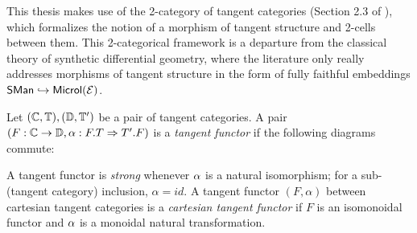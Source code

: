 This thesis makes use of the 2-category of tangent categories (Section 2.3 of \cite{Cockett2014}), which formalizes the notion of a morphism of tangent structure and 2-cells between them. This 2-categorical framework is a departure from the classical theory of synthetic differential geometry, where the literature only really addresses morphisms of tangent structure in the form of fully faithful embeddings $\mathsf{SMan} \hookrightarrow \mathsf{Microl}(\mathcal{E})$.

\begin{definition}\label{def:tang-functor}
    Let $(\mathbb{C}, \mathbb{T}), (\mathbb{D}, \mathbb{T}')$ be a pair of tangent categories. A pair $(F: \mathbb{C} \to \mathbb{D}, \alpha:F.T \Rightarrow T'.F)$ is a \emph{tangent functor} if the following diagrams commute:
    \begin{center}
        
    \end{center}
    A tangent functor is \emph{strong} whenever $\alpha$ is a natural isomorphism; for a sub-(tangent category) inclusion, $\alpha = id$.  A tangent functor $(F, \alpha)$ between cartesian tangent categories is a \emph{cartesian tangent functor} if $F$ is an isomonoidal functor and $\alpha$ is a monoidal natural transformation. 
\end{definition}
